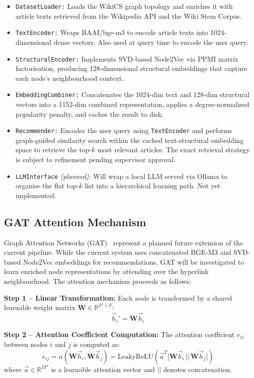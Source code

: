 \begin{itemize}
    \item \texttt{DatasetLoader:} Loads the WikiCS graph topology and enriches it with article texts retrieved from the Wikipedia API and the Wiki Stem Corpus.
    \item \texttt{TextEncoder:} Wraps BAAI/bge-m3 to encode article texts into 1024-dimensional dense vectors. Also used at query time to encode the user query.
    \item \texttt{StructuralEncoder:} Implements SVD-based Node2Vec via PPMI matrix factorisation, producing 128-dimensional structural embeddings that capture each node's neighbourhood context.
    \item \texttt{EmbeddingCombiner:} Concatenates the 1024-dim text and 128-dim structural vectors into a 1152-dim combined representation, applies a degree-normalised popularity penalty, and caches the result to disk.
    \item \texttt{Recommender:} Encodes the user query using \texttt{TextEncoder} and performs graph-guided similarity search within the cached text-structural embedding space to retrieve the top-$k$ most relevant articles. The exact retrieval strategy is subject to refinement pending supervisor approval.
    \item \texttt{LLMInterface} \textit{(planned):} Will wrap a local LLM served via Ollama to organise the flat top-$k$ list into a hierarchical learning path. Not yet implemented.
\end{itemize}


\subsection{GAT Attention Mechanism}

Graph Attention Networks (GAT)~\cite{velickovic2018graph} represent a planned future extension of the current pipeline. While the current system uses concatenated BGE-M3 and SVD-based Node2Vec embeddings for recommendations, GAT will be investigated to learn enriched node representations by attending over the hyperlink neighbourhood. The attention mechanism proceeds as follows:

\textbf{Step 1 -- Linear Transformation:} Each node is transformed by a shared learnable weight matrix $\mathbf{W} \in \mathbb{R}^{F' \times F}$:
\[
\vec{h}_i' = \mathbf{W} \vec{h}_i
\]

\textbf{Step 2 -- Attention Coefficient Computation:} The attention coefficient $e_{ij}$ between nodes $i$ and $j$ is computed as:
\[
e_{ij} = \alpha(\mathbf{W}\vec{h}_i, \mathbf{W}\vec{h}_j) = \text{LeakyReLU}\!\left(\vec{a}^T \bigl[\mathbf{W}\vec{h}_i \, || \, \mathbf{W}\vec{h}_j \bigr]\right)
\]
where $\vec{a} \in \mathbb{R}^{2F'}$ is a learnable attention vector and $||$ denotes concatenation.

